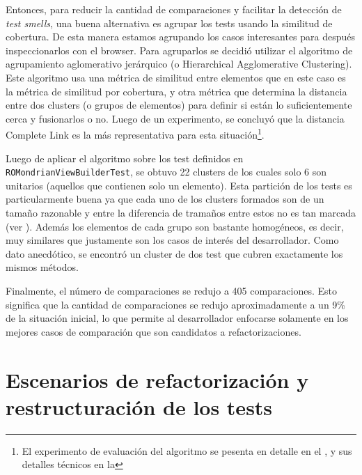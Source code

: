 \par Entonces, para reducir la cantidad de comparaciones y facilitar la detección de \emph{test smells}, una buena alternativa es agrupar los tests usando la similitud de cobertura. De esta manera estamos agrupando los casos interesantes para después inspeccionarlos con el browser. Para agruparlos se decidió utilizar el algoritmo de agrupamiento aglomerativo jerárquico (o Hierarchical Agglomerative Clustering). Este algoritmo usa una métrica de similitud entre elementos que en este caso es la métrica de similitud por cobertura, y otra métrica que determina la distancia entre dos clusters (o grupos de elementos) para definir si están lo suficientemente cerca y fusionarlos o no. Luego de un experimento, se concluyó que la distancia Complete Link es la más representativa para esta situación\footnote{El experimento de evaluación del algoritmo se pesenta en detalle en el , y sus detalles técnicos en la  }.

\par Luego de aplicar el algoritmo sobre los test definidos en {\tt ROMondrianViewBuilderTest}, se obtuvo 22 clusters de los cuales solo 6 son unitarios (\ie aquellos que contienen solo un elemento). Esta partición de los tests es particularmente buena ya que cada uno de los clusters formados son de un tamaño razonable y entre la diferencia de tramaños entre estos no es tan marcada (ver ). Además los elementos de cada grupo son bastante homogéneos, es decir, muy similares que justamente son los casos de interés del desarrollador. Como dato anecdótico, se encontró un cluster de dos test que cubren exactamente los mismos métodos. 


\par Finalmente, el número de comparaciones se redujo a 405 comparaciones. Esto significa que la cantidad de comparaciones se redujo aproximadamente a un 9\% de la situación inicial, lo que permite al desarrollador enfocarse solamente en los mejores casos de comparación que son candidatos a refactorizaciones.

\section{Escenarios de refactorización y restructuración de los tests}

